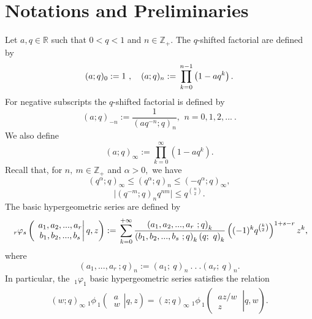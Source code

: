 \documentclass[12pt,a4paper]{amsart}
\numberwithin{equation}{section}
\theoremstyle{plain}
\theoremstyle{definition}
\theoremstyle{remark}
\numberwithin{equation}{section}
\numberwithin{table}{section}
\numberwithin{figure}{section}
\begin{document}
\section{Notations and Preliminaries}
Let $ a , q \in {\mathbb{R}} $ such that $0<q<1$ and $n \in {\mathbb{Z}}_{+}. $ The
$q$-shifted factorial are defined by \cite{GR}
\begin{equation}(a ;
q)_{0}: =1 \ , \quad  (a ; q)_{n} := {\displaystyle}\prod_{k=0}^{n-1}\left(1 -
aq^{k}\right).
\end{equation}
For negative subscripts the $q$-shifted factorial is defined by
\begin{equation}
(a;q)_{-n}:=\frac{1}{(aq^{-n};q)_n},\,\ n=0,1,2,...\ \label{13}.
\end{equation}
We also define
\begin{equation}
(a;q)_{\infty}:=\prod_{k=0}^{\infty}(1-aq^k).
\end{equation} Recall that, for $n,\ m\in \mathbb{Z}_+$ and $\alpha>0,$ we have \\
 \begin{equation}
 (q^{\alpha};q)_{\infty}\leq(q^{\alpha};q)_n\leq (-q^{\alpha};q)_{\infty},\label{inq1}
 \end{equation}
 \begin{equation}
 \mid(q^{-m};q)_n q^{nm}\mid \leq q^{\binom{n}{2}}\label{inq}.
 \end{equation}
The basic hypergeometric series are defined by
\begin{equation}
   \ _{r}\varphi_{s} \left(\left. \begin{matrix} \ a_{1}, a_{2}, ..., a_{r}\\
  \ b_1,b_{2},...,b_s\end{matrix}\right\vert q,z\right):={\displaystyle}\sum_{k=0}^{+\infty}{\displaystyle}\frac{\left(a_{1}, a_{2},
. . . , a_{r} \ ; q \right)_{k}}{\left(b_{1}, b_{2}, . . . , b_{s} \
; q \right)_{k}\left(q;\ q \right)_{k}}
\left((-1)^{k}q^{\left(^{k}_{2}\right)}\right)^{1+s-r}z^{k}, \label{14}
\end{equation} where
\begin{equation*}\left(a_{1}, . . . , a_{r} \ ; q \right)_{n}:= \left(a_{1}; \
q\right)_{n} \ . \  . \ . \left(a_{r};\ q\right)_{n}.
 \end{equation*}In
particular, the $\ _{1}\varphi_{1}$ basic hypergeometric series
satisfies the relation
\begin{align}
(w;q)_{\infty} \ _{1}\phi_{\ 1}\left( \left. \begin{matrix} \ a\  \\
\ w\end{matrix}\right\vert q,z \right)=(z;q)_{\infty} \ _{1}\phi_{\ 1}\left( \left. \begin{matrix} \ az/w\  \\
\ z\end{matrix}\right\vert q,w\right). \label{symmetric}
\end{align}
\end{document}
